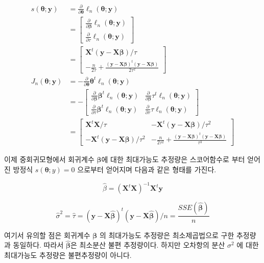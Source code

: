 \documentclass[
  11pt,
  a4paper,
  oneside]{scrbook}
\newcommand{\pardifftwo}[2]{\frac{\partial #1}{\partial #2 }}
\theoremstyle{definition}
\theoremstyle{plain}
\theoremstyle{definition}
\theoremstyle{definition}
\theoremstyle{remark}
\begin{document}
\[
\begin{align}
s( \pmb \theta;  \pmb y) & =  \pardifftwo{}{ \pmb \theta}\ell_n( \pmb \theta;  \pmb y ) \\
  & =  \begin{bmatrix}
    \pardifftwo{}{ \pmb  \beta}\ell_n( \pmb \theta;  \pmb y ) \\
    \pardifftwo{}{\tau}\ell_n( \pmb \theta;  \pmb y ) 
  \end{bmatrix} \\
  & = 
  \begin{bmatrix}
     \pmb X^t ( \pmb y- \pmb X  \pmb \beta)/\tau \\
    -\frac{n}{2\tau} +\frac { ( \pmb y- \pmb X  \pmb \beta)^t ( \pmb y- \pmb X  \pmb \beta) }{2\tau^2} 
  \end{bmatrix} \\
 J_n( \pmb \theta;  \pmb y) & =  -\pardifftwo{}{ \pmb \theta}{ {\pmb \theta}^t}\ell_n( \pmb \theta;\pmb y ) \\
  & = 
  - \begin{bmatrix}
    \pardifftwo{}{\pmb \beta}{ {\pmb \beta}^t}\ell_n( \pmb \theta;\pmb y ) & \pardifftwo{}{ \pmb \beta}{\tau^t}\ell_n( \pmb \theta;\pmb y )  \\
    \pardifftwo{}{\tau}{ {\pmb \beta}^t}\ell_n( \pmb \theta;\pmb y )  & \pardifftwo{}{\tau}{\tau}\ell_n( \pmb \theta; \pmb y ) 
  \end{bmatrix} \\
   & = 
  \begin{bmatrix}
      {\pmb X}^t  \pmb X /\tau &  - {\pmb X}^t ( \pmb y- \pmb X  \pmb \beta)/\tau^2   \\
    - {\pmb X}^t ( \pmb y- \pmb X  \pmb \beta)/\tau^2  &  - \frac{n}{2\tau^2} +\frac { ( \pmb y- \pmb X \pmb  \beta)^t ( \pmb y- \pmb X  \pmb \beta) }{\tau^3} 
  \end{bmatrix}
\end{align}
\]

이제 중회귀모형에서 회귀계수 \(\pmb \beta\)에 대한 최대가능도 추정량은
스코어함수로 부터 얻어진 방정식 \(s( \pmb \theta; y)= 0\) 으로부터
얻어지며 다음과 같은 형태를 가진다.

\[ \hat { \beta} = ( {\pmb X}^t  \pmb X)^{-1} {\pmb  X}^t  \pmb y \]

\[   \hat \sigma^2 = \hat \tau = ( \pmb y-\pmb  X  \hat {\pmb \beta})^t ( \pmb y- \pmb X  \hat {\pmb \beta})/n = \frac{SSE(\hat{\pmb  \beta})}{n} \]

여기서 유의할 점은 회귀계수 \(\pmb \beta\) 의 최대가능도 추정량은
최소제곱법으로 구한 추정량과 동일하다. 따라서 \(\hat {\pmb  \beta}\)은
최소분산 불편 추정량이다. 하지만 오차항의 분산 \(\sigma^2\) 에 대한
최대가능도 추정량은 불편추정량이 아니다.
\end{document}
